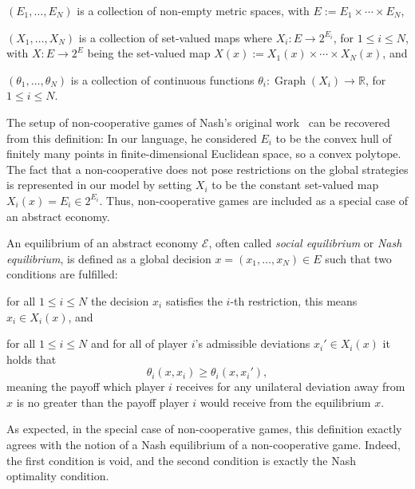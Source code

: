 \documentclass[a4paper,11pt,reqno,english]{amsart}
\theoremstyle{definition}
\newcommand\R{\mathbb R}
\begin{document}
\begin{compactitem}[\quad --]
	\item $(E_1,\dots,E_N)$ is a collection of non-empty metric spaces, with $E:=E_1\times \cdots\times E_N$,
	\item $(X_1,\dots,X_N)$  is a collection of set-valued maps where $X_i\colon E\longrightarrow 2^{E_i}$, for $1\leq i\leq N$, with $X\colon E\longrightarrow 2^E$ being the set-valued map $X(x):= X_1(x)\times\cdots\times X_N(x)$, and
	\item  $(\theta_1,\dots,\theta_N)$ is a collection of continuous functions $\theta_i\colon\operatorname{Graph}(X_i)\longrightarrow\R$, for $1\leq i\leq N$.
\end{compactitem}

The setup of non-cooperative games of Nash's original work~\cite{Nash1951} can be recovered from this definition: In our language, he considered $E_i$ to be the convex hull of finitely many points in finite-dimensional Euclidean space, so a convex polytope.
The fact that a non-cooperative does not pose restrictions on the global strategies is represented in our model by setting $X_i$ to be the constant set-valued map $X_i(x)=E_i\in 2^{E_i}$.
Thus, non-cooperative games are included as a special case of an abstract economy.

\medskip
An equilibrium of an abstract economy $\mathcal{E}$, often called \textit{social equilibrium} or \textit{Nash equilibrium},
is defined as a global decision $x=(x_1,\dots,x_N)\in E$ such that two conditions are fulfilled:
\begin{compactitem}[\quad --]
	\item for all $1\leq i \leq N$ the decision $x_i$ satisfies the $i$-th restriction, this means $x_i\in X_i(x)$, and
	\item for all $1\leq i \leq N$ and for all of player $i$'s admissible deviations $x_i'\in X_i(x)$ it holds that
	\begin{displaymath}
		\theta_i(x,x_i) \geq \theta_i(x,x_i'),
	\end{displaymath}
	meaning the payoff which player $i$ receives for any unilateral deviation away from $x$ is no greater than the payoff player $i$ would receive from the equilibrium $x$.
\end{compactitem}
As expected, in the special case of non-cooperative games, this definition exactly agrees with the notion of a Nash equilibrium of a non-cooperative game.
Indeed, the first condition is void, and the second condition is exactly the Nash optimality condition.
\end{document}

